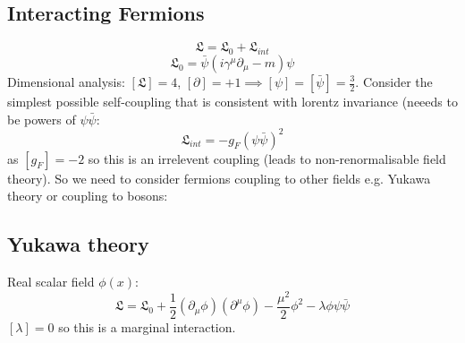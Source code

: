 \documentclass[12pt, a4paper, twoside, titlepage]{article}
\begin{document}
\begin{pmartix}
\subsection{Interacting Fermions}
$$
\mathfrak{L} = \mathfrak{L}_0 + \mathfrak{L}_{int}
$$
$$
\mathfrak{L}_0 = \bar \psi (i \gamma^{\mu}\partial_{\mu} - m) \psi
$$
Dimensional analysis: $[\mathfrak{L}] = 4$, $[\partial ] = +1 \implies [\psi] = [\bar \psi] = \frac{3}{2}$. Consider the simplest possible self-coupling that is consistent with lorentz invariance (neeeds to be powers of $\psi \bar \psi$:
$$
\mathfrak{L}_{int} = - g_F(\psi \bar \psi)^2
$$
as $[g_F] = -2$ so this is an irrelevent coupling (leads to non-renormalisable field theory). So we need to consider fermions coupling to other fields e.g. Yukawa theory or coupling to bosons:
\subsection{Yukawa theory}
Real scalar field $\phi(x)$:
$$
\mathfrak{L} = \mathfrak{L}_0 + \frac{1}{2} (\partial_{\mu} \phi)(\partial ^{\mu} \phi) - \frac{\mu^2}{2} \phi^2 - \lambda \phi \psi \bar \psi
$$
$[\lambda] = 0$ so this is a marginal interaction.

\end{pmartix}
\end{document}
